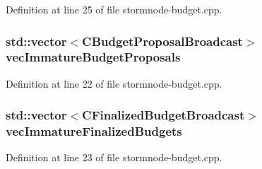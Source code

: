 Definition at line 25 of file stormnode-\/budget.\+cpp.

\hypertarget{stormnode-budget_8cpp_ad799c6b69cfbea7cdd37386b6b2a1429}{}
\subsubsection[{vec\+Immature\+Budget\+Proposals}]{\setlength{\rightskip}{0pt plus 5cm}std\+::vector$<${\bf C\+Budget\+Proposal\+Broadcast}$>$ vec\+Immature\+Budget\+Proposals}\label{stormnode-budget_8cpp_ad799c6b69cfbea7cdd37386b6b2a1429}


Definition at line 22 of file stormnode-\/budget.\+cpp.

\hypertarget{stormnode-budget_8cpp_adc3baf3c59479fff7d14e28c1496a178}{}
\subsubsection[{vec\+Immature\+Finalized\+Budgets}]{\setlength{\rightskip}{0pt plus 5cm}std\+::vector$<${\bf C\+Finalized\+Budget\+Broadcast}$>$ vec\+Immature\+Finalized\+Budgets}\label{stormnode-budget_8cpp_adc3baf3c59479fff7d14e28c1496a178}


Definition at line 23 of file stormnode-\/budget.\+cpp.


